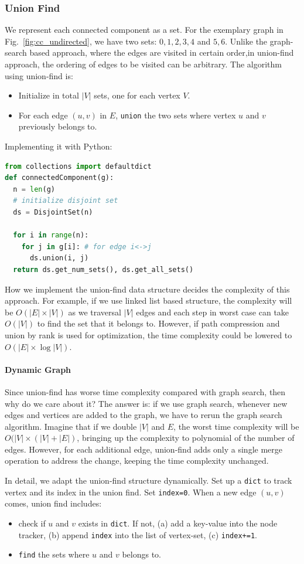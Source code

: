 \documentclass[../main.tex]{subfiles}
\begin{document}
\subsubsection{Union Find}
We represent each connected component as a set. For the exemplary graph in Fig.~\ref{fig:cc_undirected}, we have two sets: ${0, 1, 2, 3, 4}$ and ${5, 6}$. Unlike the graph-search based approach, where the edges are visited in certain order,in union-find approach, the ordering of edges to be visited can be arbitrary. The algorithm using union-find is: 
\begin{itemize}
    \item Initialize in total $|V|$ sets, one for each vertex $V$.
    \item For each edge $(u, v)$ in $E$, \texttt{union} the two sets where vertex $u$ and $v$ previously belongs to.
\end{itemize}
Implementing it with Python:
\begin{lstlisting}[language=Python]
from collections import defaultdict
def connectedComponent(g):
  n = len(g)
  # initialize disjoint set
  ds = DisjointSet(n)

  for i in range(n):
    for j in g[i]: # for edge i<->j
      ds.union(i, j)
  return ds.get_num_sets(), ds.get_all_sets() 
\end{lstlisting}
How we implement the union-find data structure decides the complexity of this approach. For example, if we use linked list based structure, the complexity will be $O(|E|\times|V|)$ as we traversal $|V|$ edges and each step in worst case can take $O(|V|)$ to find the set that it belongs to. However, if path compression and union by rank is used for optimization, the time complexity could be lowered to $O(|E|\times \log|V|)$. 
\paragraph{Dynamic Graph} Since union-find has worse time complexity compared with graph search, then why do we care about it? The answer is: if we use graph search, whenever new edges and vertices are added to the graph, we have to rerun the graph search algorithm. Imagine that if we double $|V|$ and $E$, the worst time complexity will be $O(|V|\times (|V|+|E|)$, bringing up the complexity to polynomial of the number of edges. However, for each additional edge, union-find adds only a single merge operation to address the change, keeping the time complexity unchanged. 

In detail, we adapt the union-find structure dynamically. Set up a \texttt{dict} to track vertex and its index in the union find. Set \texttt{index=0}. When a new edge $(u, v)$ comes, union find includes:
\begin{itemize}
    \item check if $u$ and $v$ exists in \texttt{dict}. If not, (a) add a key-value into the node tracker, (b) append \texttt{index} into the list of vertex-set, (c) \texttt{index+=1}.
    \item \texttt{find} the sets where $u$ and $v$ belongs to. 
\end{itemize}
\end{document}
